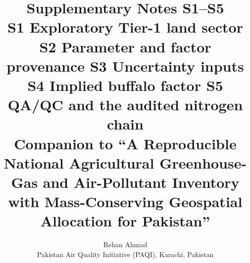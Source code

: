 \documentclass[a4paper,11pt]{article}
\title{Supplementary Notes S1--S5\\[2pt]
\large S1 Exploratory Tier-1 land sector \textbullet{} S2 Parameter and factor
provenance \textbullet{} S3 Uncertainty inputs \textbullet{} S4 Implied buffalo
factor \textbullet{} S5 QA/QC and the audited nitrogen chain\\[4pt]
\normalsize Companion to ``A Reproducible National Agricultural Greenhouse-Gas and
Air-Pollutant Inventory with Mass-Conserving Geospatial Allocation for Pakistan''}
\author{Rehan Ahmad\\ \small Pakistan Air Quality Initiative (PAQI), Karachi, Pakistan}
\date{}
\begin{document}
\maketitle

\ReleaseCover



\clearpage

\clearpage

\clearpage






\end{document}
